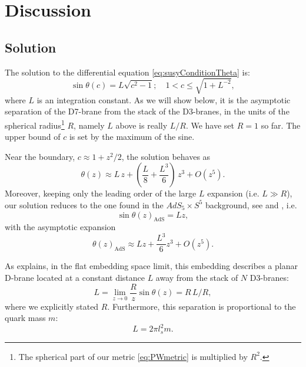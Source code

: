 \section{Discussion}\label{sec:discussion}

\subsection{Solution}\label{sec:solution}

The solution to the differential equation \eqref{eq:susyConditionTheta} is:
\begin{equation}\label{eq:susyConditionSolution}
\boxed{\sin\theta(c) = L \sqrt{c^2-1}; \quad 1 < c \leq \sqrt{1+L^{-2}}},
\end{equation}
where $L$ is an integration constant. As we will show below, it is the asymptotic separation of the D7-brane from the stack of the D3-branes, in the units of the spherical radius\footnote{The spherical part of our metric \eqref{eq:PWmetric} is multiplied by $R^2$.} $R$, namely $L$ above is really $ L/R$.
We have set $R=1$ so far. The upper bound of $c$ is set by the maximum of the sine.


Near the boundary, $c \approx 1 + z^2/2$, the solution behaves as
\begin{equation} \label{eq:thetaExpanded}
 \theta(z) \approx L \, z + \left(\frac{L}{8} +\frac{L^3}{6} \right) \, z^3 + O(z^5).
\end{equation} 
Moreover, keeping only the leading order of the large $L$ expansion (i.e. $L\gg R$), our solution reduces to the one found in the $AdS_5 \times S^5$ background, see \cite{Karch:2002sh} and \cite{Karch:2005ms}, i.e.
\begin{equation}
 \sin\theta(z)_\text{AdS} = L z,
\end{equation}
with the asymptotic expansion
\begin{equation}
\theta(z)_\text{AdS} \approx L z + \frac{L^3}{6} z^3 + O(z^5).
\end{equation}



As \cite{Karch:2005ms} explains, in the flat embedding space limit, this embedding describes a planar D-brane located at a constant distance $L$ away from the stack of $N$ D3-branes:
\begin{equation}
 L = \lim_{z \rightarrow 0 } \frac{R}{z} \sin\theta(z) = R \, L/R,
\end{equation}
where we explicitly stated $R$. Furthermore, this separation is proportional to the quark mass $m$:
\begin{equation}
 L = 2 \pi l_s^2 m.
\end{equation}


